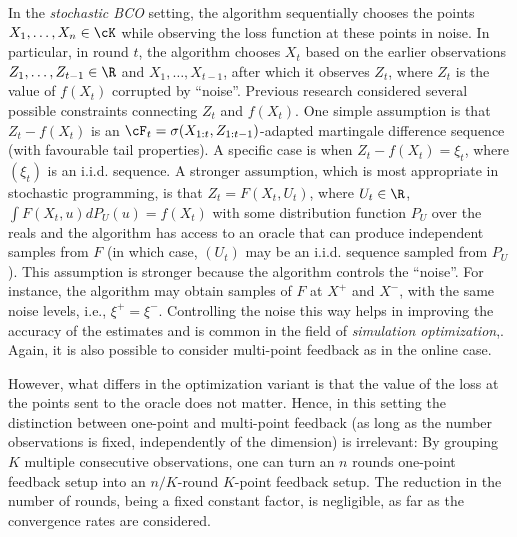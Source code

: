 In the \emph{stochastic BCO} setting, 
the algorithm sequentially chooses the points $X_1,\dots,X_n\in \cK$ while observing the loss function at these points in noise.
In particular, in round $t$, the algorithm chooses $X_t$ based on the earlier observations $Z_1,\dots,Z_{t-1}\in \R$ and $X_1,\dots,X_{t-1}$, after which it observes $Z_t$, where $Z_t$ is the value of $f(X_t)$ corrupted by ``noise''.
Previous research considered several possible constraints connecting $Z_t$ and $f(X_t)$.
One simple assumption is that $Z_t-f(X_t)$ is an $\cF_t = \sigma(X_{1:t},Z_{1:t-1})$-adapted martingale difference sequence (with favourable tail properties). 
A specific case is when $Z_t - f(X_t) = \xi_t$, where $(\xi_t)$ is an i.i.d. sequence.
A stronger assumption, which is most appropriate in stochastic programming, 
is that $Z_t = F(X_t,U_t)$, where $U_t\in \R$, $\int F(X_t,u) dP_U(u) = f(X_t)$ with some distribution function $P_U$ over the reals and the algorithm has access to an oracle that can produce independent samples from $F$ (in which case, $(U_t)$ may be an i.i.d. sequence sampled from $P_U$).
This assumption is stronger because the algorithm controls the
``noise''. 
For instance, the algorithm may obtain samples of $F$ at $X^+$ and $X^-$, with the same noise levels, i.e., $\xi^+=\xi^-$. 
Controlling the noise this way helps in improving the accuracy of the estimates and is common in the field of \textit{simulation optimization},. 
Again, it is also possible to consider multi-point feedback as in the online case.

However, what differs in the optimization variant is that the value of the loss at the points sent to the oracle does not matter.
Hence, in this setting the distinction between one-point and multi-point feedback (as long as the number observations is fixed, independently of the dimension) is irrelevant: 
By grouping $K$ multiple consecutive observations, one can turn an $n$ rounds one-point feedback setup into an $n/K$-round $K$-point feedback setup. The reduction in the number of rounds, being a fixed constant factor, is negligible, as far as the convergence rates are considered.

